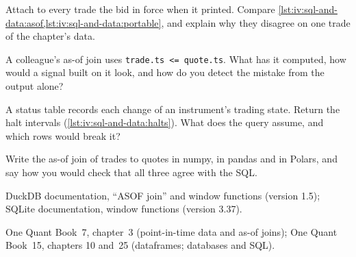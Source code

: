 \begin{interviewq}\label{iq:iv:sql-and-data:10}
Attach to every trade the bid in force when it printed. Compare \cref{lst:iv:sql-and-data:asof,lst:iv:sql-and-data:portable}, and
explain why they disagree on one trade of the chapter's data.
\end{interviewq}

\begin{interviewq}\label{iq:iv:sql-and-data:11}
A colleague's as-of join uses \texttt{trade.ts <= quote.ts}. What has it computed, how would a signal built on it look, and how do you
detect the mistake from the output alone?
\end{interviewq}

\label{lst:iv:sql-and-data:halts}

\begin{interviewq}\label{iq:iv:sql-and-data:12}
A status table records each change of an instrument's trading state. Return the halt intervals (\cref{lst:iv:sql-and-data:halts}).
What does the query assume, and which rows would break it?
\end{interviewq}

\begin{interviewq}\label{iq:iv:sql-and-data:13}
Write the as-of join of trades to quotes in numpy, in pandas and in Polars, and say how you would check that all three agree with
the SQL.
\end{interviewq}

\begin{omsources}
\item DuckDB documentation, ``ASOF join'' and window functions (version 1.5); SQLite documentation, window functions (version 3.37).
\item One Quant Book~7, chapter~3 (point-in-time data and as-of joins); One Quant Book~15, chapters 10 and~25 (dataframes; databases
and SQL).
\end{omsources}
